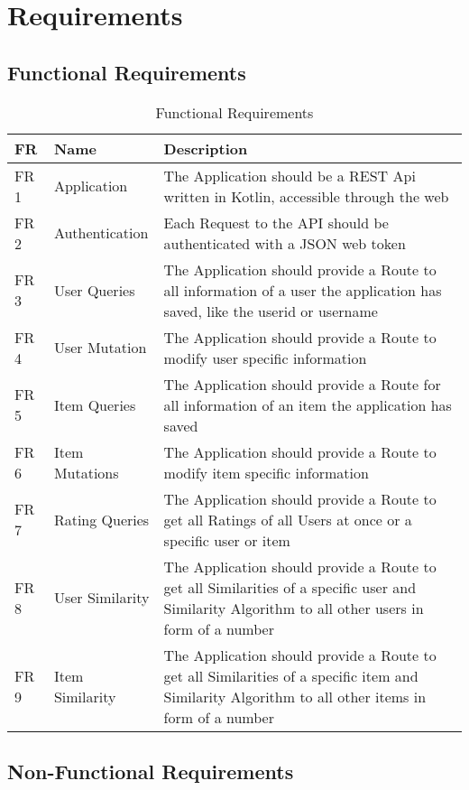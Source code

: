 \chapter{Requirements}

\section{Functional Requirements}

\begin{table}[h]
\begin{center}
\begin{tabular}{|p{1cm}||p{3cm}|p{9cm}|}
    \hline
	  FR & Name & Description \\
	\hline
	FR 1 & Application    & The Application should be a REST Api written in Kotlin, accessible through the web \\
    \hline
	FR 2 & Authentication & Each Request to the API should be authenticated with a JSON web token \\
	\hline
    FR 3 & User Queries & The Application should provide a Route to all information of a user the application has saved, like the userid or username \\
	\hline
    FR 4 & User Mutation & The Application should provide a Route to modify user specific information \\
	\hline
    FR 5 & Item Queries & The Application should provide a Route for all information of an item the application has saved \\
	\hline
    FR 6 & Item Mutations & The Application should provide a Route to modify item specific information \\
	\hline
    FR 7 & Rating Queries & The Application should provide a Route to get all Ratings of all Users at once or a specific user or item \\
	\hline
    FR 8 & User Similarity & The Application should provide a Route to get all Similarities of a specific user and Similarity Algorithm to all other users in form of a number  \\
	\hline
    FR 9 & Item Similarity & The Application should provide a Route to get all Similarities of a specific item and Similarity Algorithm to all other items in form of a number \\
	\hline
\end{tabular}
\end{center}
\caption{Functional Requirements}
\label{tab:fas}
\end{table}


\section{Non-Functional Requirements}